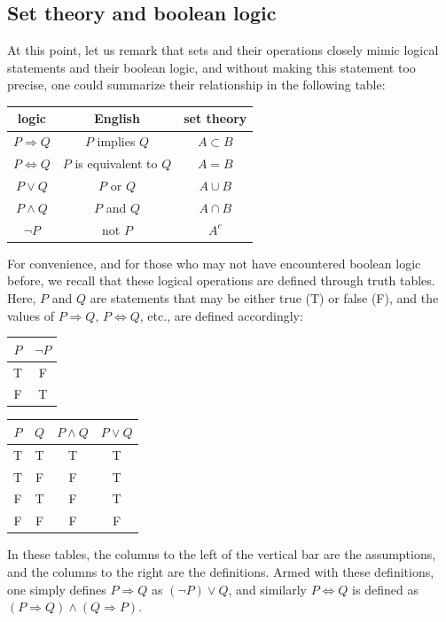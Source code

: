 \subsection{Set theory and boolean logic}
At this point, let us remark that sets and their operations closely mimic logical statements and their boolean logic, and without making this statement too precise, one could summarize their relationship in the following table:

\begin{center}
\begin{tabular}{ccc}
  logic & English & set theory \\
  \hline
  $P \Rightarrow Q$ & $P$ implies $Q$ & $A \subset B$ \\
  $P \Leftrightarrow Q$ & $P$ is equivalent to $Q$ & $A = B$ \\
  $P \vee Q$ & $P$ or $Q$ & $A \cup B$ \\
  $P \wedge Q$ & $P$ and $Q$ & $A\cap B$ \\
  $\neg P$ & not $P$ & $A^c$
\end{tabular}
\end{center}

For convenience, and for those who may not have encountered boolean logic before, we recall that these logical operations are defined through truth tables. Here, $P$ and $Q$ are statements that may be either true (T) or false (F), and the values of $P \Rightarrow Q$, $P \Leftrightarrow Q$, etc., are defined accordingly:
\begin{center}
\begin{tabular}{c|c}
  $P$ & $\neg P$ \\
  \hline
  T & F \\
  F & T
\end{tabular}
\quad \quad
\begin{tabular}{cc|cc}
  $P$ & $Q$ & $P \wedge Q$ & $P \vee Q$ \\
  \hline
  T & T & T & T \\
  T & F & F & T \\
  F & T & F & T \\
  F & F & F & F
\end{tabular}
\end{center}

In these tables, the columns to the left of the vertical bar are the assumptions, and the columns to the right are the definitions. Armed with these definitions, one simply defines $P \Rightarrow Q$ as $(\neg P) \vee Q$, and similarly $P \Leftrightarrow Q$ is defined as $(P \Rightarrow Q) \wedge (Q \Rightarrow P)$.

